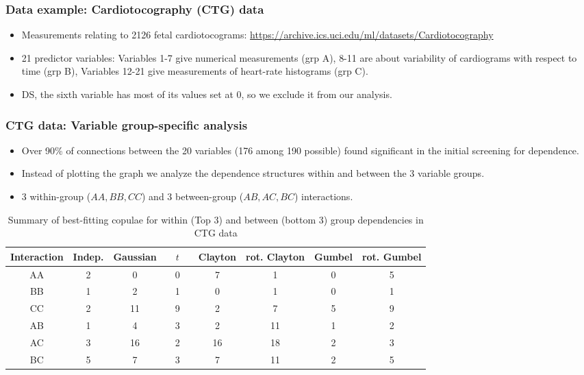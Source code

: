 \documentclass[handout,10pt]{beamer}
\begin{document}
\begin{frame}
\frametitle{Data example: Cardiotocography (CTG) data}
\begin{itemize}
\item Measurements relating to 2126 fetal cardiotocograms: \url{https://archive.ics.uci.edu/ml/datasets/Cardiotocography}
\vspace{.2cm}
\item 21 predictor variables: Variables 1-7 give numerical measurements (grp A), 8-11 are about variability of cardiograms with respect to time (grp B), Variables 12-21 give measurements of heart-rate histograms (grp C).
\vspace{.2cm}
\item DS, the sixth variable has most of its values set at 0, so we exclude it from our analysis.
\end{itemize}
\end{frame}

\begin{frame}
\frametitle{CTG data: Variable group-specific analysis}
\begin{itemize}
\item Over 90\% of connections between the 20 variables (176 among 190 possible) found significant in the initial screening for dependence.
\item Instead of plotting the graph we analyze the dependence structures within and between the 3 variable groups.
\item 3 within-group ($AA, BB, CC$) and 3 between-group ($AB, AC, BC$) interactions.
\end{itemize}
\begin{scriptsize}
\begin{table}[ht]\centering
    \begin{tabular}{|c||c|c|c|c|c|c|c|}
    \hline
    Interaction & Indep. & Gaussian & $\quad t\quad$ & Clayton & rot. Clayton & Gumbel & rot. Gumbel \\ \hline
    AA                  & 2           & 0        & 0 & 7       & 1               & 0      & 5              \\
    BB                  & 1           & 2        & 1 & 0       & 1               & 0      & 1              \\
    CC                  & 2           & 11       & 9 & 2       & 7               & 5      & 9              \\ \hline\hline
    AB                  & 1           & 4        & 3 & 2       & 11              & 1      & 2              \\
    AC                  & 3           & 16       & 2 & 16      & 18              & 2      & 3              \\
    BC                  & 5           & 7        & 3 & 7       & 11              & 2      & 5              \\ \hline
    \end{tabular}
    \caption{Summary of best-fitting copulae for within (Top 3) and between (bottom 3) group dependencies in CTG data}
\end{table}
\end{scriptsize}
\end{frame}
\end{document}
